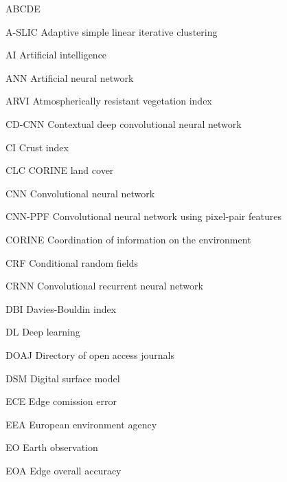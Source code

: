 
\begin{seznamzkratek}{ABCDE}

	      {A-SLIC}
	      {\qquad Adaptive simple linear iterative clustering}

	      {AI}
	      {\qquad Artificial intelligence}

	      {ANN}
	      {\qquad Artificial neural network}

	      {ARVI}
	      {\qquad Atmospherically resistant vegetation index}

	      {CD-CNN}
	      {\hspace{5.0mm} Contextual deep convolutional neural network}

	      {CI}
	      {\qquad Crust index}

	      {CLC}
	      {\qquad CORINE land cover}

	      {CNN}
	      {\qquad Convolutional neural network}

	      {CNN-PPF}
	      {\hspace{2.9mm} Convolutional neural network using pixel-pair features}

	      {CORINE}
	      {\hspace{5.0mm} Coordination of information on the environment}

	      {CRF}
	      {\qquad Conditional random fields}

	      {CRNN}
	      {\qquad Convolutional recurrent neural network}

	      {DBI}
	      {\qquad Davies-Bouldin index}

	      {DL}
	      {\qquad Deep learning}

	      {DOAJ}
	      {\qquad Directory of open access journals}

	      {DSM}
	      {\qquad Digital surface model}

	      {ECE}
	      {\qquad Edge comission error}

	      {EEA}
	      {\qquad European environment agency}

	      {EO}
	      {\qquad Earth observation}

	      {EOA}
	      {\qquad Edge overall accuracy}


\end{seznamzkratek}
